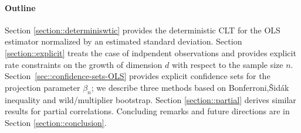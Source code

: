 \documentclass{article}
\begin{document}
\paragraph{Outline}
Section \ref{section::determiniswtic}
provides the deterministic CLT for
the OLS estimator normalized by an estimated
standard deviation.
Section \ref{section::explicit}
treats the case of indpendent observations
and provides explicit rate constraints on
the growth of dimension $d$ with respect to
the sample size $n$.
Section~\ref{sec::confidence-sets-OLS} provides
explicit confidence sets for the projection
parameter $\beta_n$; we describe three methods
based on Bonferroni,{\v{S}}id{\'a}k inequality
and wild/multiplier bootstrap.
Section \ref{section::partial}
derives similar results for partial correlations.
Concluding remarks and future directions are in
Section \ref{section::conclusion}.
\end{document}

